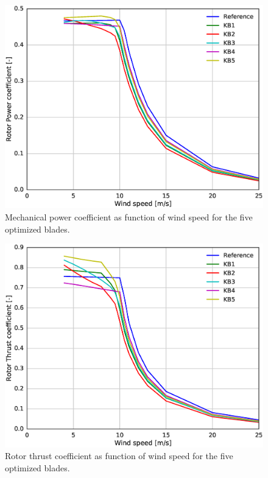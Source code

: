 \begin{figure}[pht]
\begin{center}
	\includegraphics[width=.85\linewidth]{figures/KBcomp_Cp.eps}
\end{center}
\caption{Mechanical power coefficient as function of wind speed for the five optimized blades.}
\label{fig:cp}
\end{figure}

\begin{figure}[pht]
\begin{center}
	\includegraphics[width=.85\linewidth]{figures/KBcomp_CT.eps}
\end{center}
\caption{Rotor thrust coefficient as function of wind speed for the five optimized blades.}
\label{fig:ct}
\end{figure}

